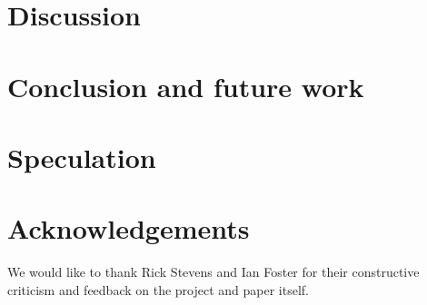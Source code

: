 \documentclass[sigconf]{acmart}
\begin{document}
\section{Discussion}\label{sec:discussion}


\section{Conclusion and future work}\label{sec:futurework}


\section{Speculation}\label{sec:speculation}


\section{Acknowledgements}\label{sec:acks}
We would like to thank Rick Stevens and Ian Foster for their constructive criticism and feedback on the project and paper itself.




\appendix
\appendixpage


\end{document}
